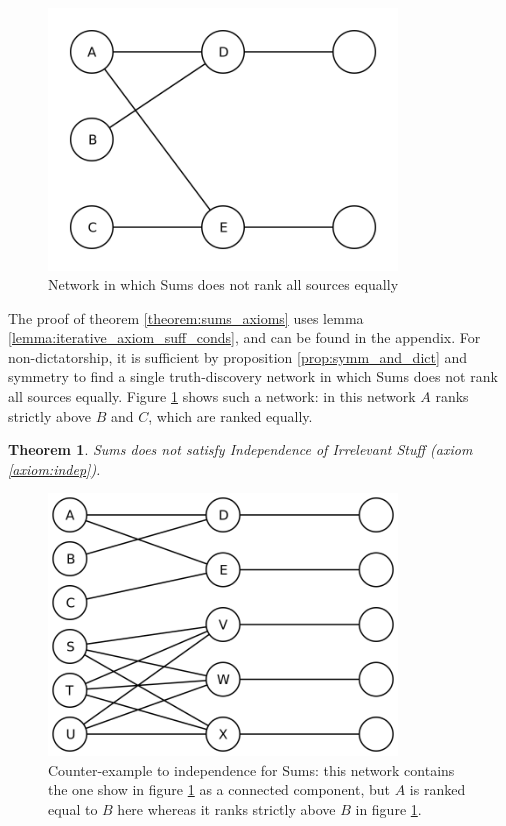 \documentclass{article}
\theoremstyle{definition} \newtheorem{definition}{Definition}
\theoremstyle{definition} \newtheorem{example}{Example}
\theoremstyle{plain} \newtheorem{axiom}{Axiom}
\theoremstyle{plain} \newtheorem*{remark}{Remark}
\theoremstyle{remark} \newtheorem*{notation}{Notation}
\theoremstyle{plain} \newtheorem{lemma}{Lemma}
\theoremstyle{plain} \newtheorem{theorem}{Theorem}
\theoremstyle{plain} \newtheorem{proposition}{Proposition}
\begin{document}
\begin{figure}
    \centering
    \includegraphics[width=25em]{sums_not_all_equal_trust}
    \caption{Network in which Sums does not rank all sources equally}
    \label{img:sums_not_all_equal_trust}
\end{figure}

The proof of theorem \ref{theorem:sums_axioms} uses lemma
\ref{lemma:iterative_axiom_suff_conds}, and can be found in the appendix. For
non-dictatorship, it is sufficient by proposition \ref{prop:symm_and_dict} and
symmetry to find a single truth-discovery network in which Sums does not rank
all sources equally. Figure \ref{img:sums_not_all_equal_trust} shows such a
network: in this network $A$ ranks strictly above $B$ and $C$, which are ranked
equally.

\begin{theorem}
\label{theorem:sums_non_indep}
Sums does not satisfy Independence of Irrelevant Stuff (axiom
\ref{axiom:indep}).
\end{theorem}

\begin{figure}
    \centering
    \includegraphics[width=25em]{sums_non_independence}
    \caption{
        Counter-example to independence for Sums: this network contains the one
        show in figure \ref{img:sums_not_all_equal_trust} as a connected
        component, but $A$ is ranked equal to $B$ here whereas it ranks
        strictly above $B$ in figure \ref{img:sums_not_all_equal_trust}.
    }
    \label{img:sums_non_indep}
\end{figure}
\end{document}
